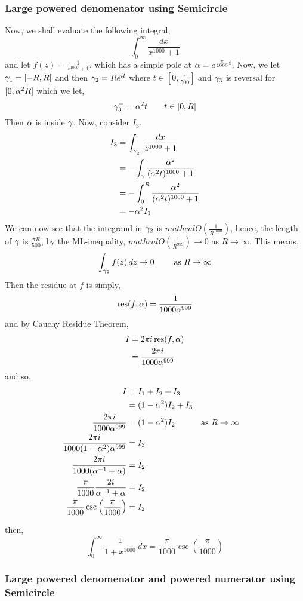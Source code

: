 \documentclass{article}
\begin{document}
\subsubsection{Large powered denomenator using Semicircle}

Now, we shall evaluate the following integral,
$$ \int_0^\infty { \frac{dx}{x^{1000} + 1}} $$
and let $f(z) = \frac{1}{z^{1000} + 1}$, which has a simple pole at $\alpha = e^{\frac{\pi}{1000}i}$. Now, we let $ \gamma_1 = [-R, R] $  and then $\gamma_2 = Re^{it}$ where $t \in [0, \frac{\pi}{500}]$ and $\gamma_3$ is reversal for $[0, \alpha^2R]$ which we let,
$$ \gamma_3^{-} = \alpha^2t \qquad  t \in [0, R]$$
Then $\alpha$ is inside $\gamma$. Now, consider $I_3$,
\begin{align*}
  I_3 &= \int_{\gamma_3^{-}} \frac{dx}{z^{1000} + 1}\\
  &= -\int_{\gamma} {\frac{\alpha^2}{(\alpha^2t)^{1000} + 1}} \\
  &= -\int_0^R {\frac{\alpha^2}{(\alpha^2t)^{1000} + 1}}\\
  &= - \alpha^2 I_1
\end{align*}
We can now see that the integrand in $\gamma_2$ is $mathcal{O}(\frac{1}{R^{1000}})$, hence, the length of $\gamma$ is $\frac{\pi R}{500}$, by the ML-inequality, $mathcal{O}(\frac{1}{R^{999}}) \to 0$ as $R \to \infty$. This means,
$$ \int_{\gamma_2} f(z)\,dz \to 0 \qquad \text{ as } R \to \infty$$
Then the residue at $f$ is simply,
$$ \operatorname*{res} (f, \alpha) = \frac{1}{1000\alpha ^ {999}} $$
and by Cauchy Residue Theorem,
\begin{align*}
  I &= 2\pi i \operatorname*{res} (f, \alpha)\\
  &= \frac{2\pi i}{1000\alpha^{999}}
\end{align*}
and so,
\begin{align*}
  I &= I_1 + I_2 + I_3\\
  &= (1 - \alpha^2)I_2 + I_3\\
  \frac{2\pi i}{1000\alpha^{999}} &= (1 - \alpha^2)I_2 && \text{as $R \to \infty$}\\
  \frac{2\pi i}{1000(1 - \alpha^2)\alpha^{999}} &= I_2\\
  \frac{2\pi i}{1000(\alpha^{-1} + \alpha)} &= I_2\\
  \frac{\pi}{1000}\frac{2i}{\alpha^{-1} + \alpha} &= I_2\\
  \frac{\pi}{1000}\csc \left(\frac{\pi}{1000}\right) &= I_2
\end{align*}

then,
$$ \int_{0}^\infty \frac{1}{1 + x^{1000}}\,dx = \frac{\pi}{1000}\csc \left(\frac{\pi}{1000}\right) $$

\subsubsection{Large powered denomenator and powered numerator using Semicircle}
\end{document}
